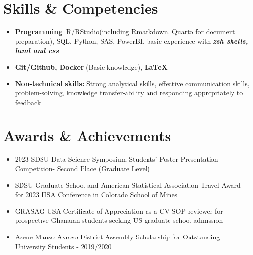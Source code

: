 \documentclass[letterpaper,11pt]{article}
\newcommand{\resumeSubHeadingListStart}{\begin{itemize}[leftmargin=0pt]}
\newcommand{\resumeSubHeadingListEnd}{\end{itemize}}
\begin{document}
\section{Skills \& Competencies}
  \resumeSubHeadingListStart
    \item{
      \textbf{Programming}{: R/RStudio(including Rmarkdown, Quarto for document preparation), SQL, Python, SAS, PowerBI, basic experience with \textbf{\textit{zsh shells, html and css}}}\vspace{-8pt}
    }
	\item{\textbf{Git/Github, Docker} (Basic knowledge), \textbf{\LaTeX}}\vspace{-8pt}
	\item{
		\textbf{Non-technical skills:} {Strong analytical skills, effective communication skills, problem-solving, knowledge transfer-ability and responding appropriately to feedback}
	}
  \resumeSubHeadingListEnd
  
\section{Awards \& Achievements}
\resumeSubHeadingListStart
\item 2023 SDSU Data Science Symposium Students' Poster Presentation Competition- Second Place (Graduate Level)\vspace{-6pt}
\item SDSU Graduate School and American Statistical Association Travel Award for 2023 IISA Conference in Colorado School of Mines\vspace{-6pt}
\item GRASAG-USA  Certificate of Appreciation as a CV-SOP reviewer for prospective Ghanaian students seeking US graduate school admission\vspace{-6pt}
\item Asene Manso Akroso District Assembly Scholarship for Outstanding University Students - 2019/2020
\resumeSubHeadingListEnd

\end{document}
